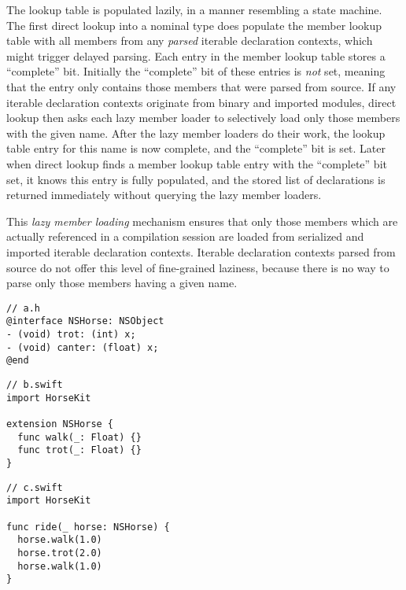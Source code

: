 \documentclass[../generics]{subfiles}
\begin{document}
The lookup table is populated lazily, in a manner resembling a state machine. The first direct lookup into a nominal type does populate the member lookup table with all members from any \emph{parsed} iterable declaration contexts, which might trigger delayed parsing. Each entry in the member lookup table stores a ``complete'' bit. Initially the ``complete'' bit of these entries is \emph{not} set, meaning that the entry only contains those members that were parsed from source. If any iterable declaration contexts originate from binary and imported modules, direct lookup then asks each lazy member loader to selectively load only those members with the given name. After the lazy member loaders do their work, the lookup table entry for this name is now complete, and the ``complete'' bit is set. Later when direct lookup finds a member lookup table entry with the ``complete'' bit set, it knows this entry is fully populated, and the stored list of declarations is returned immediately without querying the lazy member loaders.

This \emph{lazy member loading} mechanism ensures that only those members which are actually referenced in a compilation session are loaded from serialized and imported iterable declaration contexts. Iterable declaration contexts parsed from source do not offer this level of fine-grained laziness, because there is no way to parse only those members having a given name.

\begin{listing}\label{lazy member listing}
\begin{Verbatim}
// a.h
@interface NSHorse: NSObject
- (void) trot: (int) x;
- (void) canter: (float) x;
@end
\end{Verbatim}
\begin{Verbatim}
// b.swift
import HorseKit

extension NSHorse {
  func walk(_: Float) {}
  func trot(_: Float) {}
}
\end{Verbatim}
\begin{Verbatim}
// c.swift
import HorseKit

func ride(_ horse: NSHorse) {
  horse.walk(1.0)
  horse.trot(2.0)
  horse.walk(1.0)
}
\end{Verbatim}
\end{listing}
\end{document}
